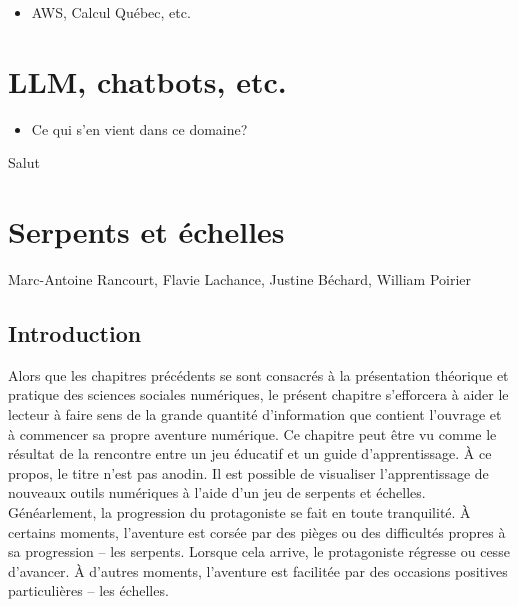 \documentclass[
  letterpaper,
]{scrbook}
\providecommand{\tightlist}{%
  \setlength{\itemsep}{0pt}\setlength{\parskip}{0pt}}\usepackage{longtable,booktabs,array}
\begin{document}
\begin{itemize}
\tightlist
\item
  AWS, Calcul Québec, etc.
\end{itemize}


\hypertarget{llm-chatbots-etc.}{%
\chapter{LLM, chatbots, etc.}\label{llm-chatbots-etc.}}

\begin{itemize}
\tightlist
\item
  Ce qui s'en vient dans ce domaine?
\end{itemize}

Salut


\hypertarget{serpents-et-uxe9chelles}{%
\chapter{Serpents et échelles}\label{serpents-et-uxe9chelles}}

\begin{center}

Marc-Antoine Rancourt, Flavie Lachance, Justine Béchard, William Poirier

\end{center}

\hypertarget{introduction-2}{%
\section{Introduction}\label{introduction-2}}

Alors que les chapitres précédents se sont consacrés à la présentation
théorique et pratique des sciences sociales numériques, le présent
chapitre s'efforcera à aider le lecteur à faire sens de la grande
quantité d'information que contient l'ouvrage et à commencer sa propre
aventure numérique. Ce chapitre peut être vu comme le résultat de la
rencontre entre un jeu éducatif et un guide d'apprentissage. À ce
propos, le titre n'est pas anodin. Il est possible de visualiser
l'apprentissage de nouveaux outils numériques à l'aide d'un jeu de
serpents et échelles. Généarlement, la progression du protagoniste se
fait en toute tranquilité. À certains moments, l'aventure est corsée par
des pièges ou des difficultés propres à sa progression -- les serpents.
Lorsque cela arrive, le protagoniste régresse ou cesse d'avancer. À
d'autres moments, l'aventure est facilitée par des occasions positives
particulières -- les échelles.
\end{document}
